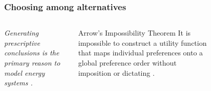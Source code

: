 \begin{frame}
    \frametitle{Choosing among alternatives}
    \begin{columns}
        \column[t]{6cm}
        
        \textit{Generating prescriptive conclusions is the primary reason to
        model energy systems \cite{decarolis_using_2011}.}\\~\\


        \begin{block}{Arrow's Impossibility Theorem}
            It is impossible to construct a utility function that maps
            individual preferences onto a global preference order without
            imposition or dictating \cite{kasprzyk_many_2013,
            franssen_arrows_2005,arrow_difficulty_1950}.
        \end{block}

        \column[t]{4cm}
        \begin{figure}
            \centering
        \end{figure}
        
    \end{columns}

\end{frame}


